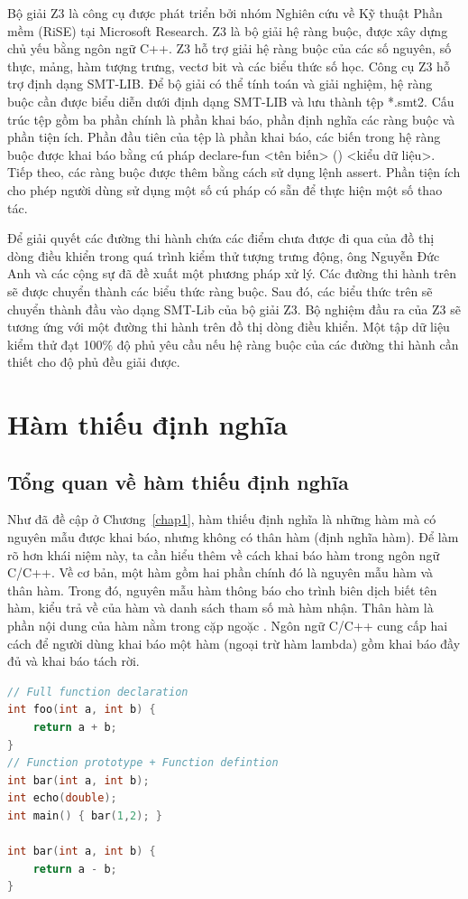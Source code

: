Bộ giải Z3 là công cụ được phát triển bởi nhóm Nghiên cứu về Kỹ thuật Phần mềm (RiSE) tại Microsoft Research. Z3 là bộ giải hệ ràng buộc, được xây dựng chủ yếu bằng ngôn ngữ C++. Z3 hỗ trợ giải hệ ràng buộc của các số nguyên, số thực, mảng, hàm tượng trưng, vectơ bit và các biểu thức số học. Công cụ Z3 hỗ trợ định dạng SMT-LIB. Để bộ giải có thể tính toán và giải nghiệm, hệ ràng buộc cần được biểu diễn dưới định dạng SMT-LIB và lưu thành tệp *.smt2. Cấu trúc tệp gồm ba phần chính là phần khai báo, phần định nghĩa các ràng buộc và phần tiện ích. Phần đầu tiên của tệp là phần khai báo, các biến trong hệ ràng buộc được khai báo bằng cú pháp declare-fun <tên biến> () <kiểu dữ liệu>. Tiếp theo, các ràng buộc được thêm bằng cách sử dụng lệnh assert. Phần tiện ích cho phép người dùng sử dụng một số cú pháp có sẵn để thực hiện một số thao tác.

Để giải quyết các đường thi hành chứa các điểm chưa được đi qua của đồ thị dòng điều khiển trong quá trình kiểm thử tượng trưng động, ông Nguyễn Đức Anh và các cộng sự đã đề xuất một phương pháp xử lý. Các đường thi hành trên sẽ được chuyển thành các biểu thức ràng buộc. Sau đó, các biểu thức trên sẽ chuyển thành đầu vào dạng SMT-Lib của bộ giải Z3. Bộ nghiệm đầu ra của Z3 sẽ tương ứng với một đường thi hành trên đồ thị dòng điều khiển. Một tập dữ liệu kiểm thử đạt 100\% độ phủ yêu cầu nếu hệ ràng buộc của các đường thi hành cần thiết cho độ phủ đều giải được.


\section{Hàm thiếu định nghĩa} \label{sec:kno-undefine}
\subsection{Tổng quan về hàm thiếu định nghĩa}
Như đã đề cập ở Chương~\ref{chap1}, hàm thiếu định nghĩa là những hàm mà có nguyên mẫu được khai báo, nhưng không có thân hàm (định nghĩa hàm). Để làm rõ hơn khái niệm này, ta cần hiểu thêm về cách khai báo hàm trong ngôn ngữ C/C++. Về cơ bản, một hàm gồm hai phần chính đó là nguyên mẫu hàm và thân hàm. Trong đó, nguyên mẫu hàm thông báo cho trình biên dịch biết tên hàm, kiểu trả về của hàm và danh sách tham số mà hàm nhận. Thân hàm là phần nội dung của hàm nằm trong cặp ngoặc \tcode{\{\}}. Ngôn ngữ C/C++ cung cấp hai cách để người dùng khai báo một hàm (ngoại trừ hàm lambda) gồm khai báo đầy đủ và khai báo tách rời.
\vspace{5mm}
\begin{lstlisting}[language=C++, captionpos=b, caption={Ví dụ về khai báo hàm đầy đủ và khai báo hàm tách rời.}, label={cod:kno-undef}]
// Full function declaration
int foo(int a, int b) {
	return a + b;
}
// Function prototype + Function defintion 
int bar(int a, int b);
int echo(double);
int main() { bar(1,2); }

int bar(int a, int b) {
	return a - b;	
}
\end{lstlisting}

